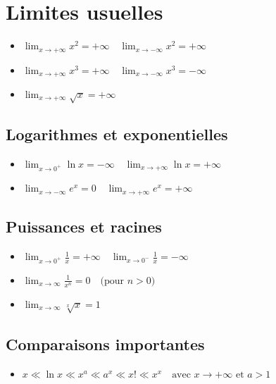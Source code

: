 \documentclass[12]{article}%
\theoremstyle{plain}
\theoremstyle{definition}
\theoremstyle{remark}
\begin{document}
\newpage
\section{Limites usuelles}
	
\begin{itemize}
	\item \( \displaystyle \lim_{x \to +\infty} x^2 = +\infty \quad \lim_{x \to -\infty} x^2 = +\infty \)
	\item \( \displaystyle \lim_{x \to +\infty} x^3 = +\infty \quad \lim_{x \to -\infty} x^3 = -\infty \)
	\item \( \displaystyle \lim_{x \to +\infty} \sqrt{x} = +\infty \)
\end{itemize}


\subsection{Logarithmes et exponentielles}

\begin{itemize}
	\item \( \displaystyle \lim_{x \to 0^+} \ln x = -\infty \quad \lim_{x \to +\infty} \ln x = +\infty \)
	\item \( \displaystyle \lim_{x \to -\infty} e^x = 0 \quad \lim_{x \to +\infty} e^x = +\infty\)
\end{itemize}

\subsection{Puissances et racines}

\begin{itemize}
	\item \( \displaystyle \lim_{x \to 0^+} \frac{1}{x} = +\infty \quad \lim_{x \to 0^-} \frac{1}{x} = -\infty \)
	\item \( \displaystyle \lim_{x \to \infty} \frac{1}{x^n} = 0 \quad \text{(pour } n > 0 \text{)} \)
	\item \( \displaystyle \lim_{x \to \infty} \sqrt[x]{x} = 1 \)
\end{itemize}

\subsection{Comparaisons importantes}

\begin{itemize}
	\item \( x \ll \ln x \ll x^a \ll a^x \ll x! \ll x^x \quad \text{avec } x \to +\infty \text{ et } a > 1 \)
\end{itemize}
\end{document}
